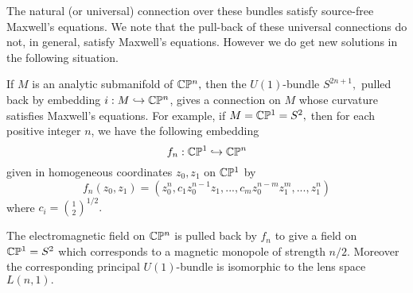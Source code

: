 The natural (or universal) connection over these bundles satisfy source-free Maxwell's equations. We note that the
pull-back of these universal connections do not, in general, satisfy Maxwell's equations. However we do get new
solutions in the following situation.

\begin{exmp}
 If $M$ is an analytic submanifold of $\mathbb C \mathbb{P}^{n},$ then the $U(1)$-bundle $S^{2n+1},$ pulled back by embedding $i: M
\hookrightarrow \mathbb C \mathbb{P}^{n}$, gives a connection on $M$ whose curvature satisfies Maxwell's equations. For example, if
$M=\mathbb C \mathbb{P}^{1}=S^{2},$ then for each positive integer $n$, we have the following embedding
$$
f_{n}: \mathbb C \mathbb{P}^{1} \hookrightarrow \mathbb C \mathbb{P}^{n}
$$
given in homogeneous coordinates $z_{0},z_{1}$ on  $\mathbb C \mathbb{P}^{1}$ by 
$$
f_{n}(z_{0},z_{1})=(z_{0}^{n}, c_{1}z_{0}^{n-1}z_{1},..., c_{m}z_{0}^{n-m}z_{1}^{m},...,z_{1}^{n})
$$
where $c_{i}=\binom{1}{2}^{1/2}.$ 

The electromagnetic field on $\mathbb C \mathbb{P}^{n}$ is pulled back by $f_{n}$ to give a field on $\mathbb C \mathbb{P}^{1}=S^{2}$ which corresponds to
a magnetic monopole of strength $n/2.$ Moreover the corresponding principal $U(1)$-bundle is isomorphic to the lens
space $L(n,1).$
\end{exmp} 




